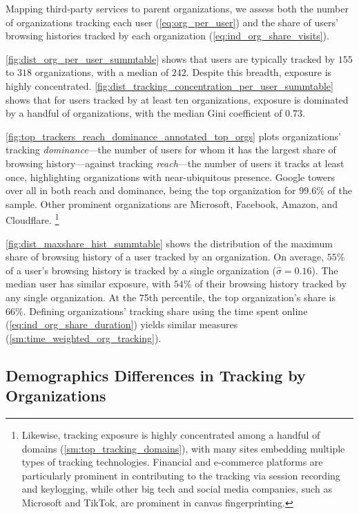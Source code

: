 \documentclass[12pt, letterpaper]{article}
\begin{document}
Mapping third-party services to parent organizations, we assess both the number of organizations tracking each user (\cref{eq:org_per_user}) and the share of users’ browsing histories tracked by each organization (\cref{eq:ind_org_share_visits}). 

\cref{fig:dist_org_per_user_summtable} shows that users are typically tracked by $155$ to $318$ organizations, with a median of $242$. Despite this breadth, exposure is highly concentrated. \cref{fig:dist_tracking_concentration_per_user_summtable} shows that for users tracked by at least ten organizations, exposure is dominated by a handful of organizations, with the median Gini coefficient of $0.73$.

\cref{fig:top_trackers_reach_dominance_annotated_top_orgs} plots organizations' tracking \textit{dominance}---the number of users for whom it has the largest share of browsing history---against tracking \textit{reach}---the number of users it tracks at least once, highlighting organizations with near-ubiquitous presence. Google towers over all in both reach and dominance, being the top organization for $99.6\%$ of the sample. Other prominent organizations are Microsoft, Facebook, Amazon, and Cloudflare.%
\footnote{
    Likewise, tracking exposure is highly concentrated among a handful of domains (\cref{sm:top_tracking_domains}), with many sites embedding multiple types of tracking technologies. Financial and e-commerce platforms are particularly prominent in contributing to the tracking via session recording and keylogging, while other big tech and social media companies, such as Microsoft and TikTok, are prominent in canvas fingerprinting.
}

\cref{fig:dist_maxshare_hist_summtable} shows the distribution of the maximum share of browsing history of a user tracked by an organization. On average, $55\%$ of a user's browsing history is tracked by a single organization ($\hat{\sigma} = 0.16$). The median user has similar exposure, with $54\%$ of their browsing history tracked by any single organization. At the 75th percentile, the top organization's share is $66\%$. Defining organizations' tracking share using the time spent online (\cref{eq:ind_org_share_duration}) yields similar measures (\cref{sm:time_weighted_org_tracking}).

\subsection{Demographics Differences in Tracking by Organizations}
\label{sec:demo_diff_organizations}
\end{document}
